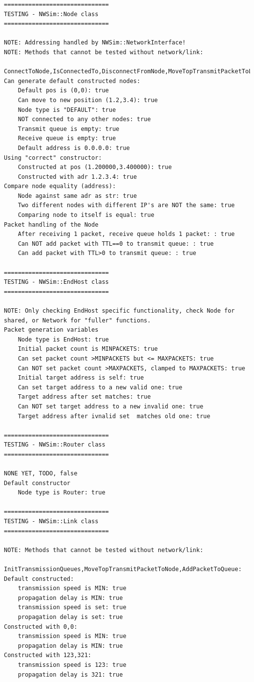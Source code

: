 \begin{lstlisting}
==============================
TESTING - NWSim::Node class
==============================

NOTE: Addressing handled by NWSim::NetworkInterface!
NOTE: Methods that cannot be tested without network/link:
	ConnectToNode,IsConnectedTo,DisconnectFromNode,MoveTopTransmitPacketToLinkRunApplication: 
Can generate default constructed nodes:
	Default pos is (0,0): true
	Can move to new position (1.2,3.4): true
	Node type is "DEFAULT": true
	NOT connected to any other nodes: true
	Transmit queue is empty: true
	Receive queue is empty: true
	Default address is 0.0.0.0: true
Using "correct" constructor:
	Constructed at pos (1.200000,3.400000): true
	Constructed with adr 1.2.3.4: true
Compare node equality (address):
	Node against same adr as str: true
	Two different nodes with different IP's are NOT the same: true
	Comparing node to itself is equal: true
Packet handling of the Node
	After receiving 1 packet, receive queue holds 1 packet: : true
	Can NOT add packet with TTL==0 to transmit queue: : true
	Can add packet with TTL>0 to transmit queue: : true

==============================
TESTING - NWSim::EndHost class
==============================

NOTE: Only checking EndHost specific functionality, check Node for shared, or Network for "fuller" functions.
Packet generation variables
	Node type is EndHost: true
	Initial packet count is MINPACKETS: true
	Can set packet count >MINPACKETS but <= MAXPACKETS: true
	Can NOT set packet count >MAXPACKETS, clamped to MAXPACKETS: true
	Initial target address is self: true
	Can set target address to a new valid one: true
	Target address after set matches: true
	Can NOT set target address to a new invalid one: true
	Target address after ivnalid set  matches old one: true

==============================
TESTING - NWSim::Router class
==============================

NONE YET, TODO, false
Default constructor
	Node type is Router: true

==============================
TESTING - NWSim::Link class
==============================

NOTE: Methods that cannot be tested without network/link:
	InitTransmissionQueues,MoveTopTransmitPacketToNode,AddPacketToQueue: 
Default constructed:
	transmission speed is MIN: true
	propagation delay is MIN: true
	transmission speed is set: true
	propagation delay is set: true
Constructed with 0,0:
	transmission speed is MIN: true
	propagation delay is MIN: true
Constructed with 123,321:
	transmission speed is 123: true
	propagation delay is 321: true


\end{lstlisting}
